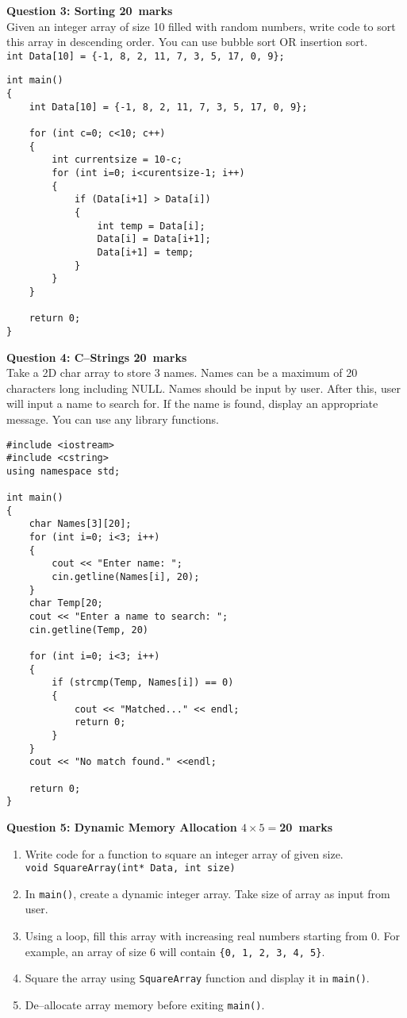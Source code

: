 \documentclass[12pt,a4paper]{article}
\def\Qthree{20}
\def\Qfour{20}
\def\Qfive{20}
\begin{document}
\noindent\textbf{Question 3: Sorting \hfill \Qthree~marks}\\
Given an integer array of size 10 filled with random numbers, write code to sort this array in descending order. You can use bubble sort OR insertion sort.\\
\verb|int Data[10] = {-1, 8, 2, 11, 7, 3, 5, 17, 0, 9};|
\begin{lstlisting}[escapechar=!]
int main()
{
	int Data[10] = {-1, 8, 2, 11, 7, 3, 5, 17, 0, 9};

	for (int c=0; c<10; c++)
	{
		int currentsize = 10-c;
		for (int i=0; i<curentsize-1; i++)
		{
			if (Data[i+1] > Data[i])
			{
				int temp = Data[i];
				Data[i] = Data[i+1];
				Data[i+1] = temp;
			}
		}
	}

	return 0;
}
\end{lstlisting}
\newpage
\noindent\textbf{Question 4: C--Strings \hfill \Qfour~marks}\\
Take a 2D char array to store 3 names. Names can be a maximum of 20 characters long including NULL. Names should be input by user. After this, user will input a name to search for. If the name is found, display an appropriate message. You can use any library functions.
\begin{lstlisting}[escapechar=!]
#include <iostream>
#include <cstring>
using namespace std;

int main()
{
	char Names[3][20];
	for (int i=0; i<3; i++)
	{
		cout << "Enter name: ";
		cin.getline(Names[i], 20);
	}
	char Temp[20;
	cout << "Enter a name to search: ";
	cin.getline(Temp, 20)
	
	for (int i=0; i<3; i++)
	{
		if (strcmp(Temp, Names[i]) == 0)
		{
			cout << "Matched..." << endl;
			return 0;
		}
	}
	cout << "No match found." <<endl;
	
	return 0;
}
\end{lstlisting}
\newpage
\noindent\textbf{Question 5: Dynamic Memory Allocation \hfill $4\times 5=$\Qfive~marks}\\
\begin{enumerate}
\item Write code for a function to square an integer array of given size.\\
\verb|void SquareArray(int* Data, int size)|
\item In \verb|main()|, create a dynamic integer array. Take size of array as input from user.
\item Using a loop, fill this array with increasing real numbers starting from 0. For example, an array of size 6 will contain \verb|{0, 1, 2, 3, 4, 5}|.
\item Square the array using \verb|SquareArray| function and display it in \verb|main()|.
\item De--allocate array memory before exiting \verb|main()|.
\end{enumerate}
\end{document}

